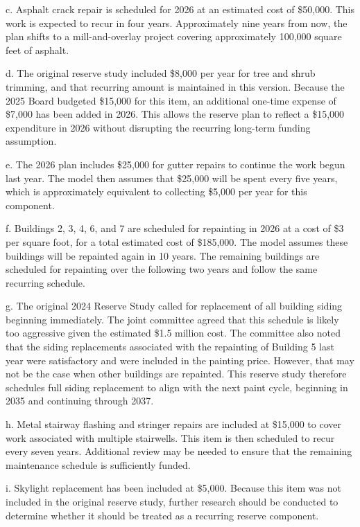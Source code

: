 \documentclass[11pt,letterpaper]{article}
\begin{document}
c. Asphalt crack repair is scheduled for 2026 at an estimated cost of \$50,000. This work is expected to recur in four years. Approximately nine years from now, the plan shifts to a mill-and-overlay project covering approximately 100,000 square feet of asphalt.

d. The original reserve study included \$8,000 per year for tree and shrub trimming, and that recurring amount is maintained in this version. Because the 2025 Board budgeted \$15,000 for this item, an additional one-time expense of \$7,000 has been added in 2026. This allows the reserve plan to reflect a \$15,000 expenditure in 2026 without disrupting the recurring long-term funding assumption.

e. The 2026 plan includes \$25,000 for gutter repairs to continue the work begun last year. The model then assumes that \$25,000 will be spent every five years, which is approximately equivalent to collecting \$5,000 per year for this component.

f. Buildings 2, 3, 4, 6, and 7 are scheduled for repainting in 2026 at a cost of \$3 per square foot, for a total estimated cost of \$185,000. The model assumes these buildings will be repainted again in 10 years. The remaining buildings are scheduled for repainting over the following two years and follow the same recurring schedule.

g. The original 2024 Reserve Study called for replacement of all building siding beginning immediately. The joint committee agreed that this schedule is likely too aggressive given the estimated \$1.5 million cost. The committee also noted that the siding replacements associated with the repainting of Building 5 last year were satisfactory and were included in the painting price. However, that may not be the case when other buildings are repainted. This reserve study therefore schedules full siding replacement to align with the next paint cycle, beginning in 2035 and continuing through 2037.

h. Metal stairway flashing and stringer repairs are included at \$15,000 to cover work associated with multiple stairwells. This item is then scheduled to recur every seven years. Additional review may be needed to ensure that the remaining maintenance schedule is sufficiently funded.

i. Skylight replacement has been included at \$5,000. Because this item was not included in the original reserve study, further research should be conducted to determine whether it should be treated as a recurring reserve component.
\end{document}
